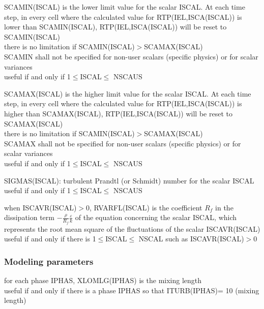 {SCAMIN(ISCAL) is the lower limit value for the scalar ISCAL. At each time step,
in every cell where the calculated value for RTP(IEL,ISCA(ISCAL)) is lower than
\mbox{SCAMIN(ISCAL)}, RTP(IEL,ISCA(ISCAL)) will be reset to
\mbox{SCAMIN(ISCAL)}\\
there is no limitation if SCAMIN(ISCAL)$>$SCAMAX(ISCAL)\\
SCAMIN shall not be specified for non-user scalars (specific physics) or for
scalar variances\\
useful if and only if 1$\leqslant$ISCAL$\leqslant$ NSCAUS}

{SCAMAX(ISCAL) is the higher limit value for the scalar ISCAL. At each time step,
in every cell where the calculated value for RTP(IEL,ISCA(ISCAL)) is higher than
\mbox{SCAMAX(ISCAL)}, RTP(IEL,ISCA(ISCAL)) will be reset to
\mbox{SCAMAX(ISCAL)}\\
there is no limitation if SCAMIN(ISCAL)$>$SCAMAX(ISCAL)\\
SCAMAX shall not be specified for non-user scalars (specific physics) or for
scalar variances\\
useful if and only if 1$\leqslant$ISCAL$\leqslant$ NSCAUS}

{SIGMAS(ISCAL): turbulent Prandtl (or Schmidt) number for the scalar ISCAL\\
useful if and only if  1$\leqslant$ISCAL$\leqslant$ NSCAUS}

{when ISCAVR(ISCAL)$>$0, RVARFL(ISCAL) is the coefficient $R_f$ in the
dissipation term $\displaystyle -\frac{\rho}{R_f}\frac{\varepsilon}{k}$
of the equation concerning the scalar ISCAL,
which represents the root mean square of the
fluctuations of the scalar ISCAVR(ISCAL)\\
useful if and only if there is 1$\leqslant$ISCAL$\leqslant$ NSCAL such as
 ISCAVR(ISCAL)$>$0}


\subsubsection{Modeling parameters}

{for each phase IPHAS, XLOMLG(IPHAS) is the mixing length\\
useful if and only if there is a phase IPHAS so that ITURB(IPHAS)= 10
(mixing length)}

